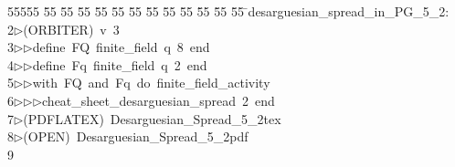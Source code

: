 %
%
\begin{tabbing}
55555 \= 55 \= 55 \= 55 \= 55 \= 55 \= 55 \= 55 \= 55 \= 55 \= 55 \= 55 \= 55 \= \>desarguesian\_spread\_in\_PG\_5\_2:\\[0pt]
2\>$\triangleright$\>(ORBITER)\ v\ 3\ \\[0pt]
3\>$\triangleright$\>$\triangleright$\>define\ FQ\ finite\_field\ q\ 8\ end\ \\[0pt]
4\>$\triangleright$\>$\triangleright$\>define\ Fq\ finite\_field\ q\ 2\ end\ \\[0pt]
5\>$\triangleright$\>$\triangleright$\>with\ FQ\ and\ Fq\ do\ finite\_field\_activity\ \\[0pt]
6\>$\triangleright$\>$\triangleright$\>$\triangleright$\>cheat\_sheet\_desarguesian\_spread\ 2\ end\\[0pt]
7\>$\triangleright$\>(PDFLATEX)\ Desarguesian\_Spread\_5\_2tex\\[0pt]
8\>$\triangleright$\>(OPEN)\ Desarguesian\_Spread\_5\_2pdf\\[0pt]
9\>\end{tabbing}
